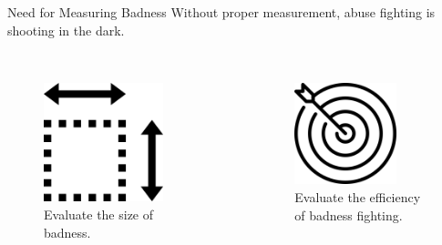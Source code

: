 \documentclass[nobackground,dvipsnames,table]{beamer}
\begin{document}
\begin{frame}{Need for Measuring Badness}
    Without proper measurement, abuse fighting is shooting in the dark. \\~\\
    \begin{columns}
            \begin{figure}
                \centering
                \caption{Evaluate the size of badness.}
                \includegraphics[width=0.75\textwidth]{size-of-badness}
            \end{figure}
            \begin{figure}
                \centering
                \caption{Evaluate the efficiency of badness fighting.}
                \includegraphics[width=0.75\textwidth]{efficiency-of-badness-fighting}

\end{figure}
\end{columns}
\end{frame}
\end{document}
